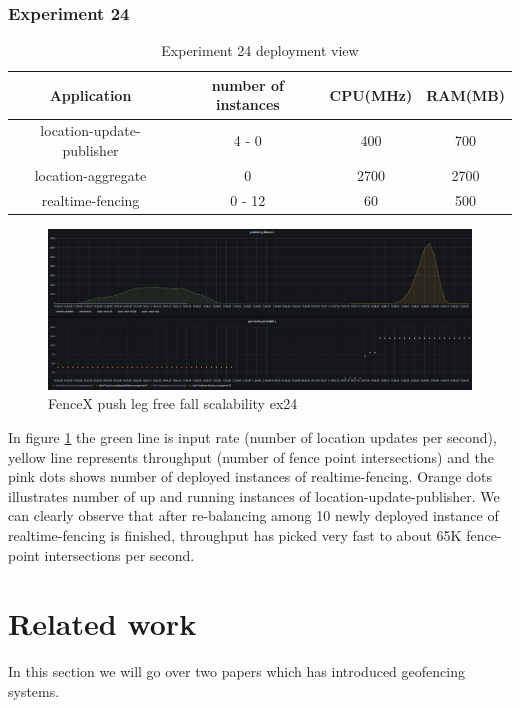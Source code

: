 \documentclass[a4]{report}
\begin{document}
    \subsubsection{Experiment 24}
    \begin{table}[h!]
        \centering
        \begin{tabular}{|c|c|c|c|}
            \hline
            Application               & number of instances & CPU(MHz) & RAM(MB) \\
            \hline
            location-update-publisher & 4 - 0               & 400      & 700     \\
            location-aggregate        & 0                   & 2700     & 2700    \\
            realtime-fencing          & 0 - 12              & 60       & 500     \\
            \hline
        \end{tabular}
        \caption{Experiment 24 deployment view}
        \label{table:ex24-dv}
    \end{table}

    \begin{figure}[h!]
        \caption{FenceX push leg free fall scalability ex24}
        \label{fig:ex24}
        \includegraphics[scale=0.4]{images/evaluation/ex24-benchmarking-ongoing-1per2sec.png}
    \end{figure}
    In figure \ref{fig:ex24} the green line is input rate (number of location updates per second),
    yellow line represents throughput (number of fence point intersections) and the pink dots shows number of
    deployed instances of realtime-fencing.
    Orange dots illustrates number of up and running instances of location-update-publisher.
    We can clearly observe that after re-balancing among 10 newly deployed instance of realtime-fencing is finished,
    throughput has picked very fast to about 65K fence-point intersections per second.


    \section{Related work}
    In this section we will go over two papers which has introduced geofencing systems.
\end{document}
